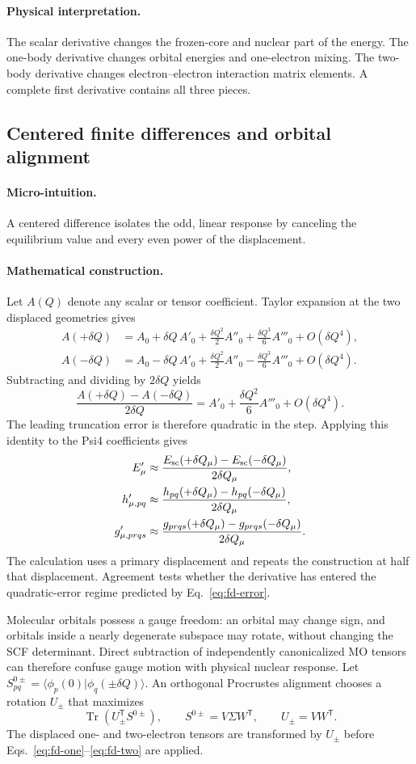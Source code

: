 \documentclass[10pt,twocolumn]{article}
\newcommand{\Tr}{\operatorname{Tr}}
\newcommand{\micro}{\paragraph{Micro-intuition.}}
\newcommand{\mathderiv}{\paragraph{Mathematical construction.}}
\newcommand{\physical}{\paragraph{Physical interpretation.}}
\begin{document}
\physical The scalar derivative changes the frozen-core and nuclear part of
the energy.  The one-body derivative changes orbital energies and one-electron
mixing.  The two-body derivative changes electron--electron interaction
matrix elements.  A complete first derivative contains all three pieces.

\subsection*{Centered finite differences and orbital alignment}

\micro A centered difference isolates the odd, linear response by canceling
the equilibrium value and every even power of the displacement.

\mathderiv Let $A(Q)$ denote any scalar or tensor coefficient.  Taylor
expansion at the two displaced geometries gives
\begin{align}
A(+\delta Q)
&=A_0+\delta Q\,A'_0+\frac{\delta Q^2}{2}A''_0
+\frac{\delta Q^3}{6}A'''_0+O(\delta Q^4),\nonumber\\
A(-\delta Q)
&=A_0-\delta Q\,A'_0+\frac{\delta Q^2}{2}A''_0
-\frac{\delta Q^3}{6}A'''_0+O(\delta Q^4).
\label{eq:fd-taylor}
\end{align}
Subtracting and dividing by $2\delta Q$ yields
\begin{equation}
\frac{A(+\delta Q)-A(-\delta Q)}{2\delta Q}
=A'_0+\frac{\delta Q^2}{6}A'''_0+O(\delta Q^4).
\label{eq:fd-error}
\end{equation}
The leading truncation error is therefore quadratic in the step.  Applying
this identity to the Psi4 coefficients gives
\begin{align}
E'_\mu&\approx\frac{E_{\rm sc}(+\delta Q_\mu)-E_{\rm sc}(-\delta Q_\mu)}
{2\delta Q_\mu},\nonumber\\
h'_{\mu,pq}&\approx\frac{h_{pq}(+\delta Q_\mu)-h_{pq}(-\delta Q_\mu)}
{2\delta Q_\mu},
\label{eq:fd-one}\\
g'_{\mu,prqs}&\approx\frac{g_{prqs}(+\delta Q_\mu)-g_{prqs}(-\delta Q_\mu)}
{2\delta Q_\mu}.
\label{eq:fd-two}
\end{align}
The calculation uses a primary displacement and repeats the construction at
half that displacement.  Agreement tests whether the derivative has entered
the quadratic-error regime predicted by Eq.~\eqref{eq:fd-error}.

Molecular orbitals possess a gauge freedom: an orbital may change sign, and
orbitals inside a nearly degenerate subspace may rotate, without changing the
SCF determinant.  Direct subtraction of independently canonicalized MO
tensors can therefore confuse gauge motion with physical nuclear response.
Let $S^{0\pm}_{pq}=\langle\phi_p(0)|\phi_q(\pm\delta Q)\rangle$.  An orthogonal
Procrustes alignment chooses a rotation $U_\pm$ that maximizes
\begin{equation}
\Tr(U_\pm^{\mathsf T}S^{0\pm}),
\qquad
S^{0\pm}=V\Sigma W^{\mathsf T},
\qquad U_\pm=VW^{\mathsf T}.
\label{eq:procrustes}
\end{equation}
The displaced one- and two-electron tensors are transformed by $U_\pm$ before
Eqs.~\eqref{eq:fd-one}--\eqref{eq:fd-two} are applied.
\end{document}
